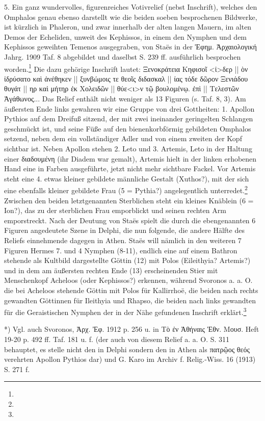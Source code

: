 \documentclass[a4paper, 11pt, oneside]{article}
\begin{document}
5. Ein ganz wundervolles, figurenreiches Votivrelief (nebst Inschrift), welches den Omphalos genau ebenso darstellt wie die beiden soeben besprochenen Bildwerke, ist kürzlich in Phaleron, und zwar innerhalb der alten langen Mauern, im alten Demos der Echeliden, unweit des Kephissos, in einem den Nymphen und dem Kephissos geweihten Temenos ausgegraben, von Staës in der Ἐφημ. Ἀρχαιολογική Jahrg. 1909 Taf. 8 abgebildet und daselbst S. 239 ff. ausführlich besprochen worden.\footnote{} Die dazu gehörige Inschrift lautet: Ξενοκράτεια Κηφισοῖ <ἰ>δερ || ὸν ἰδρύσατο καὶ ἀνέθηκεν || ξυνβώμοις τε θεοῖς διδασκαλ || ίας τόδε δῶρον Ξενιάδου θυγάτ || ηρ καὶ μήτηρ ἐκ Χολειδῶν || θύε<ι>ν τῷ βουλομένῳ. ἐπὶ || Τελεστῶν Ἀγάθωνος... Das Relief enthält nicht weniger als 13 Figuren (s. Taf. 8, 3). Am äußersten Ende links gewahren wir eine Gruppe von drei Gottheiten: 1. Apollon Pythios auf dem Dreifuß sitzend, der mit zwei ineinander geringelten Schlangen geschmückt ist, und seine Füße auf den bienenkorbförmig gebildeten Omphalos setzend, neben dem ein vollständiger Adler und von einem zweiten der Kopf sichtbar ist. Neben Apollon stehen 2. Leto und 3. Artemis, Leto in der Haltung einer διαδουμένη (ihr Diadem war gemalt), Artemis hielt in der linken erhobenen Hand eine in Farben ausgeführte, jetzt nicht mehr sichtbare Fackel. Vor Artemis steht eine 4. etwas kleiner gebildete männliche Gestalt (Xuthos?), mit der sich eine ebenfalls kleiner gebildete Frau (5 = Pythia?) angelegentlich unterredet.\footnote{} Zwischen den beiden letztgenannten Sterblichen steht ein kleines Knäblein (6 = Ion?), das zu der sterblichen Frau emporblickt und seinen rechten Arm emporstreckt. Nach der Deutung von Staës spielt die durch die ebengenannten 6 Figuren angedeutete Szene in Delphi, die nun folgende, die andere Hälfte des Reliefs einnehmende dagegen in Athen. Staës will nämlich in den weiteren 7 Figuren Hermes 7. und 4 Nymphen (8-11), endlich eine auf einem Bathron stehende als Kultbild dargestellte Göttin (12) mit Polos (Eileithyia? Artemis?) und in dem am äußersten rechten Ende (13) erscheinenden Stier mit Menschenkopf Acheloos (oder Kephissos?) erkennen, während Svoronos a. a. O. die bei Acheloos stehende Göttin mit Polos für Kallirrhoë, die beiden nach rechts gewandten Göttinnen für Ileithyia und Rhapso, die beiden nach links gewandten für die Geraistischen Nymphen der in der Nähe gefundenen Inschrift erklärt.\footnote{}


*) Vgl. auch Svoronos, Ἀρχ. Ἐφ. 1912 p. 256 u. in Τὸ ἐν Ἀθήναις Ἐθν. Μουσ. Heft 19-20 p. 492 ff. Taf. 181 u. f. (der auch von diesem Relief a. a. O. S. 311 behauptet, es stelle nicht den in Delphi sondern den in Athen als πατρῷος θεός verehrten Apollon Pythios dar) und G. Karo im Archiv f. Relig.-Wiss. 16 (1913) S. 271 f.
\end{document}
